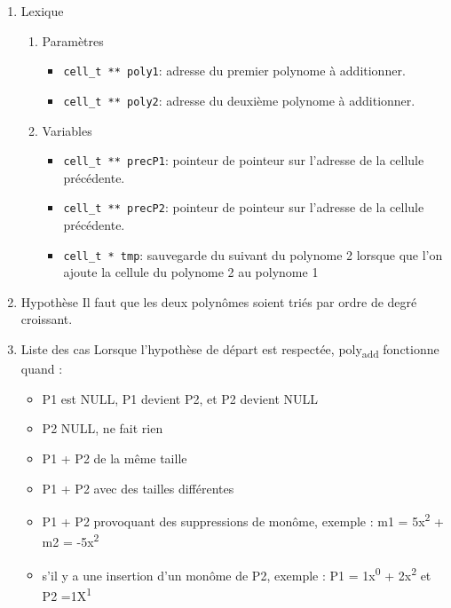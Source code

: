 \documentclass[11pt]{article}
\begin{document}
\begin{enumerate}
\item Lexique
\label{sec:orga3df803}
\begin{enumerate}
\item Paramètres
\label{sec:org770bd23}
\begin{itemize}
\item \texttt{cell\_t ** poly1}: adresse du premier polynome à additionner.
\item \texttt{cell\_t ** poly2}: adresse du deuxième polynome à additionner.
\end{itemize}
\item Variables
\label{sec:org68e050c}
\begin{itemize}
\item \texttt{cell\_t ** precP1}: pointeur de pointeur sur l'adresse de la cellule précédente.
\item \texttt{cell\_t ** precP2}: pointeur de pointeur sur l'adresse de la cellule précédente.
\item \texttt{cell\_t * tmp}: sauvegarde du suivant du polynome 2 lorsque que l'on ajoute la
cellule du polynome 2 au polynome 1
\end{itemize}
\end{enumerate}
\item Hypothèse
\label{sec:org8fe44f2}
Il faut que les deux polynômes soient triés par ordre de degré croissant.
\item Liste des cas
\label{sec:orgb8f4816}
Lorsque l'hypothèse de départ est respectée, poly\textsubscript{add} fonctionne quand :
\begin{itemize}
\item P1 est NULL, P1 devient P2, et P2 devient NULL
\item P2 NULL, ne fait rien
\item P1 + P2 de la même taille
\item P1 + P2 avec des tailles différentes
\item P1 + P2 provoquant des suppressions de monôme, exemple : m1 = 5x\textsuperscript{2} + m2 = -5x\textsuperscript{2}
\item s'il y a une insertion d'un monôme de P2, exemple : P1 = 1x\textsuperscript{0} + 2x\textsuperscript{2} et P2 =1X\textsuperscript{1}
\end{itemize}
\end{enumerate}
\end{document}
